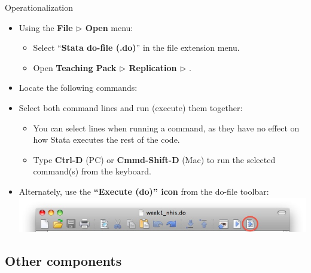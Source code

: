 \documentclass{beamer}
\begin{document}
	\begin{frame}[t]{Operationalization}
	
		\begin{itemize}
			\item Using the \textbf{File $\triangleright$ Open} menu:
			
			\begin{itemize}
				\item Select ``\textbf{Stata do-file (.do)}'' in the file extension menu.
				\item Open \textbf{Teaching Pack $\triangleright$ Replication $\triangleright$ }.
			\end{itemize}			
			
			\item Locate the following commands:

						
						
			\item Select both command lines and run (execute) them together:
			
			\begin{itemize}
				\item You can select  lines when running a command, as they have no effect on how Stata executes the rest of the code.
				\item Type \textbf{Ctrl-D} (PC) or \textbf{Cmmd-Shift-D} (Mac) to run the selected command(s) from the keyboard.
				
			\end{itemize}
\item Alternately, use the \textbf{``Execute (do)'' icon} from the do-file toolbar:
				\includegraphics[width=.9\textwidth]{images/scrn-do.jpg}
		\end{itemize}	
	
	\end{frame}				

	\subsection{Other components}
\end{document}
